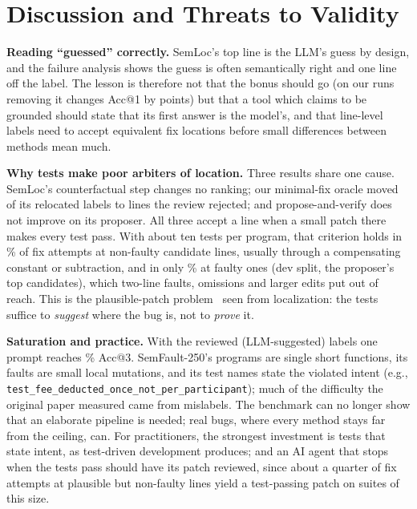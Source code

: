 \section{Discussion and Threats to Validity}
\label{sec:discussion}

\textbf{Reading ``guessed'' correctly.} SemLoc's top line is the LLM's guess by design, and the failure analysis shows the
guess is often semantically right and one line off the label. The lesson is therefore not that the bonus should go (on
our runs removing it changes Acc@1 by \RqTwoRepairedAllSemlocNoPriorDAccOne{} points) but that a tool which claims to be
grounded should state that its first answer is the model's, and that line-level labels need to accept equivalent fix
locations before small differences between methods mean much.

\textbf{Why tests make poor arbiters of location.} Three results share one cause. SemLoc's counterfactual step changes no
ranking; our minimal-fix oracle moved \ReviewCorrectedOverturnedN{} of its \GtCorrectedN{} relocated labels to lines the review
rejected; and propose-and-verify does not improve on its proposer. All three accept a line when a small patch there makes
every test pass. With about ten tests per program, that criterion holds in \PavmechReviewedOtherLineFixable\% of
fix attempts at non-faulty candidate lines, usually through a compensating constant or subtraction, and in only
\PavmechReviewedFaultLineFixable\% at faulty ones (dev split, the proposer's top candidates), which two-line faults, omissions and larger edits put out of reach. This is the plausible-patch
problem~\cite{qi2015kali,smith2015cure} seen from localization: the tests suffice to \emph{suggest} where the bug is, not to
\emph{prove} it.

\textbf{Saturation and practice.} With the reviewed (LLM-suggested) labels one prompt reaches \RqTwoReviewedAllLlmTestsAccThreeMean\% Acc@3.
SemFault-250's programs are single short functions, its faults are small local mutations, and its test names state the
violated intent (e.g., \texttt{test\_fee\_deducted\_once\_not\_per\_participant}); much of the difficulty the original paper
measured came from mislabels. The benchmark can no longer show that an elaborate pipeline is needed; real bugs, where
every method stays far from the ceiling, can. For practitioners, the strongest investment is tests that state intent, as
test-driven development produces; and an AI agent that stops when the tests pass should have its patch reviewed, since
about a quarter of fix attempts at plausible but non-faulty lines yield a test-passing patch on suites of this size.

